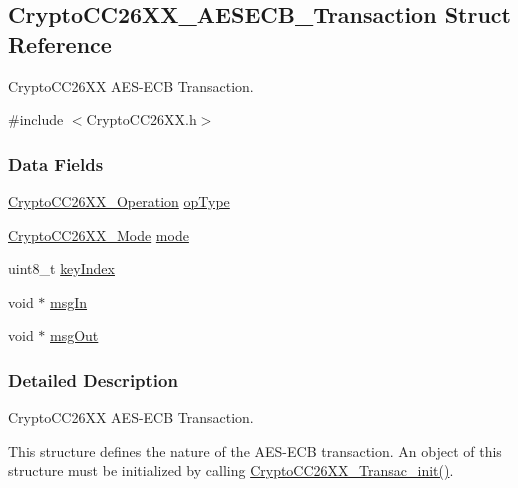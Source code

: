 \subsection{Crypto\-C\-C26\-X\-X\-\_\-\-A\-E\-S\-E\-C\-B\-\_\-\-Transaction Struct Reference}
\label{struct_crypto_c_c26_x_x___a_e_s_e_c_b___transaction}


Crypto\-C\-C26\-X\-X A\-E\-S-\/\-E\-C\-B Transaction.  




{\ttfamily \#include $<$Crypto\-C\-C26\-X\-X.\-h$>$}

\subsubsection*{Data Fields}
\begin{DoxyCompactItemize}
\item 
\hyperlink{_crypto_c_c26_x_x_8h_a28465385e5b45efecc00f2015605f970}{Crypto\-C\-C26\-X\-X\-\_\-\-Operation} \hyperlink{struct_crypto_c_c26_x_x___a_e_s_e_c_b___transaction_a538da4d16f0d7e5fdb2bf3f97bfa81be}{op\-Type}
\item 
\hyperlink{_crypto_c_c26_x_x_8h_abf86c8ac428559f00fed3299d439e2cd}{Crypto\-C\-C26\-X\-X\-\_\-\-Mode} \hyperlink{struct_crypto_c_c26_x_x___a_e_s_e_c_b___transaction_a9dafb34e220b2dfe0ac118df2afc0ae8}{mode}
\item 
uint8\-\_\-t \hyperlink{struct_crypto_c_c26_x_x___a_e_s_e_c_b___transaction_a1e144214803cec502698401343c830a1}{key\-Index}
\item 
void $\ast$ \hyperlink{struct_crypto_c_c26_x_x___a_e_s_e_c_b___transaction_ac63701080bffd789b53c7effcf46cfe9}{msg\-In}
\item 
void $\ast$ \hyperlink{struct_crypto_c_c26_x_x___a_e_s_e_c_b___transaction_ab5c3bff547308f1a63c771349cbef069}{msg\-Out}
\end{DoxyCompactItemize}


\subsubsection{Detailed Description}
Crypto\-C\-C26\-X\-X A\-E\-S-\/\-E\-C\-B Transaction. 

This structure defines the nature of the A\-E\-S-\/\-E\-C\-B transaction. An object of this structure must be initialized by calling \hyperlink{_crypto_c_c26_x_x_8h_afb3ea8faceda234cdd62c5f53e203946}{Crypto\-C\-C26\-X\-X\-\_\-\-Transac\-\_\-init()}. 

